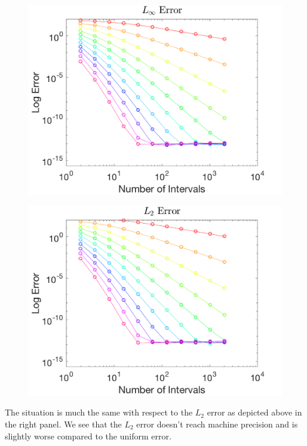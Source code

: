 \documentclass{article}
\begin{document}
\begin{figure}[H]
  \centering
  \begin{minipage}{.6\textwidth}
    \centering
    \includegraphics[width=\linewidth]{maxError_0.png}
    \label{fig:max0}
  \end{minipage}%
  \begin{minipage}{.6\textwidth}
    \centering
    \includegraphics[width=\linewidth]{squareError_0.png}
    \label{fig:max0}
  \end{minipage}%
\end{figure}

\noindent The situation is much the same with respect to the $L_2$ error as depicted above in the right panel. We see that the $L_2$ error doesn't reach machine precision and is slightly worse compared to the uniform error. \newline
\end{document}
